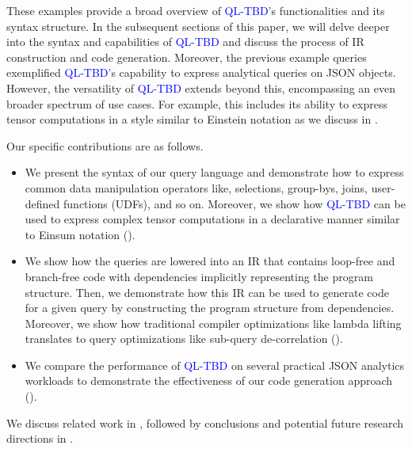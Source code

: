 \documentclass[runningheads]{llncs}
\newcommand{\lang}{\textcolor{blue}{QL-TBD}}
\begin{document}
These examples provide a broad overview of \lang{}'s functionalities and its
syntax structure.
In the subsequent sections of this paper, we will delve deeper into the syntax and capabilities
of \lang{} and discuss the process of IR construction and code generation.
Moreover, the previous example queries exemplified \lang{}'s capability to
express analytical queries on JSON objects.
However, the versatility of \lang{} extends beyond this, encompassing an even broader
spectrum of use cases. 
For example, this includes its ability to 
express tensor computations in a style similar to
Einstein notation as we discuss in .

Our specific contributions are as follows.

\begin{itemize}
    \item We present the syntax of our query language and demonstrate how to express common
          data manipulation operators like, selections, group-bys, joins, user-defined functions (UDFs),
          and so on.
          Moreover, we show how \lang{} can be used to express complex tensor computations in a declarative
          manner similar to Einsum notation ().
    \item We show how the queries are lowered into an IR that contains loop-free and branch-free code
          with dependencies implicitly representing the program structure.
          Then, we demonstrate how this IR can be used to generate code for a given query by constructing
          the program structure from dependencies.
          Moreover, we show how traditional compiler optimizations like lambda lifting translates to query
          optimizations like sub-query de-correlation ().
    \item We compare the performance of \lang{} on several practical JSON analytics workloads to demonstrate the
          effectiveness of our code generation approach ().
\end{itemize}

We discuss related work in , followed by conclusions and potential future research directions
in .
\end{document}
